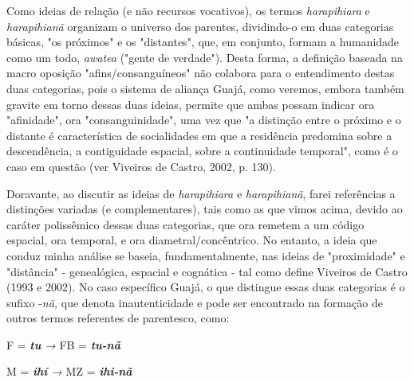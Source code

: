 Como ideias de relação (e não recursos vocativos), os termos
\emph{harapihiara} e \emph{harapihianã} organizam o universo dos
parentes, dividindo-o em duas categorias básicas, "os próximos" e os
"distantes", que, em conjunto, formam a humanidade como um todo,
\emph{awatea} ("gente de verdade"). Desta forma, a definição baseada na
macro oposição "afins/consanguíneos" não colabora para o entendimento
destas duas categorias, pois o sistema de aliança Guajá, como veremos,
embora também gravite em torno dessas duas ideias, permite que ambas
possam indicar ora "afinidade", ora "consanguinidade", uma vez que "a
distinção entre o próximo e o distante é característica de socialidades
em que a residência predomina sobre a descendência, a contiguidade
espacial, sobre a continuidade temporal", como é o caso em questão (ver
Viveiros de Castro, 2002, p. 130).

Doravante, ao discutir as ideias de \emph{harapihiara} e
\emph{harapihianã}, farei referências a distinções variadas (e
complementares), tais como as que vimos acima, devido ao caráter
polissêmico dessas duas categorias, que ora remetem a um código
espacial, ora temporal, e ora diametral/concêntrico. No entanto, a ideia
que conduz minha análise se baseia, fundamentalmente, nas ideias de
"proximidade" e "distância" - genealógica, espacial e cognática - tal
como define Viveiros de Castro (1993 e 2002). No caso específico Guajá,
o que distingue essas duas categorias é o sufixo -\emph{nã,} que denota
inautenticidade e pode ser encontrado na formação de outros termos
referentes de parentesco, como:

\begin{center}
F = \emph{\textbf{tu}} \emph{→} FB = \emph{\textbf{tu-nã}}\medskip

M = \emph{\textbf{ihí} →} MZ = \emph{\textbf{ihi-nã}}
\end{center}

